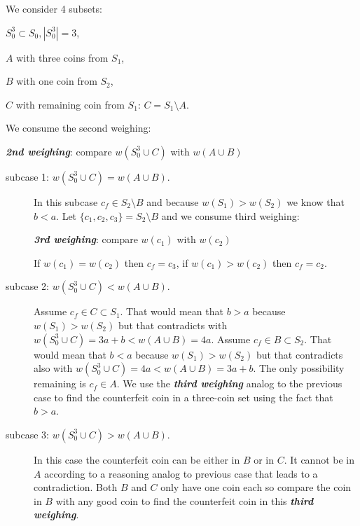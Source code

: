 \noindent We consider 4 subsets:

\begin{description}
	\item $S_0^3 \subset S_0, |S_0^3| = 3$,
	\item $A$ with three coins from $S_1$,
	\item $B$ with one coin from $S_2$,
	\item $C$ with remaining coin from $S_1$: $C = S_1 \setminus A$.
\end{description}
	
\noindent We consume the second weighing:
\begin{center} \textbf{\textit{2nd weighing}}: compare $w(S_0^3 \cup C)$ with $w(A \cup B)$ \end{center}

\begin{description}
	\item [ subcase 1: $w(S_0^3 \cup C) = w(A \cup B)$. ] In this subcase $c_f \in S_2 \setminus B$ and because $w(S_1) > w(S_2)$  we know that $b < a$. Let $\{c_1, c_2, c_3\} = S_2 \setminus B$ and we consume third weighing:
\begin{center} \textbf{\textit{3rd weighing}}: compare $w(c_1)$ with $w(c_2)$ \end{center}
If $w(c_1) = w(c_2)$ then $c_f = c_3$, if $w(c_1) > w(c_2)$ then $c_f = c_2$.	
	\item [ subcase 2: $w(S_0^3 \cup C) < w(A \cup B)$. ] Assume $c_f \in C \subset S_1$. That would mean that $b > a$ because $w(S_1) > w(S_2)$ but that contradicts with \newline
	$w(S_0^3 \cup C) = 3 a + b < w(A \cup B) = 4 a$. Assume $c_f \in B \subset S_2$. That would mean that $b < a$ because $w(S_1) > w(S_2)$ but that contradicts also with
	$w(S_0^3 \cup C) = 4 a < w(A \cup B) = 3 a + b$. The only possibility remaining is $c_f \in A$. We
	use the \textbf{\textit{third weighing}} analog to the previous case to find the counterfeit coin in a three-coin set using the fact that $b > a$.
	\item	[ subcase 3: $w(S_0^3 \cup C) > w(A \cup B)$. ]  In this case the counterfeit coin can be either in $B$ or in $C$. It cannot be in $A$ according to a reasoning analog to previous case that leads to a contradiction. Both $B$ and $C$ only have one coin each so compare the coin in $B$ with any good coin to find the counterfeit coin in this \textbf{\textit{third weighing}}.
\end{description}
	
